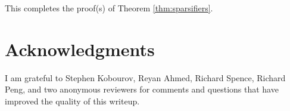 \documentclass{article}
\begin{document}
This completes the proof(s) of Theorem \ref{thm:sparsifiers}.


\section*{Acknowledgments}

I am grateful to Stephen Kobourov, Reyan Ahmed, Richard Spence, Richard Peng, and two anonymous reviewers for comments and questions that have improved the quality of this writeup.



\end{document}
